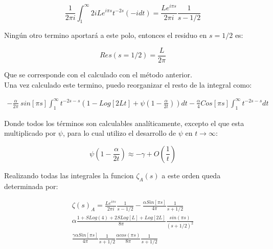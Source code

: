 \begin{equation}
    \frac{1}{2 \pi i }
    \int _1 ^{\infty}
    2 i L
    e^{i \pi s}
    t ^{-2 s}
    (-i dt) =  
    \frac{L e^{i \pi s} }{2 \pi i} \frac{1}{s-1/2   }
\end{equation}

Ningún otro termino aportará a este polo, entonces el residuo en $s= 1/2$ es:

\begin{equation}
    Res (s=1/2) = \frac{L}{2 \pi}
\end{equation}

Que se corresponde con el calculado con el método anterior. \\

Una vez calculado este termino, puedo reorganizar el resto de la integral como:

\begin{equation}
\begin{array}{c}
    - \frac{\alpha}{2 \pi} \ sin[\pi s]
    \int _1 ^{\infty}
    t ^{-2 s-s} 
    \left(
    1 - Log[2Lt] + \psi (1- \frac{\alpha}{2t})
    \right) dt - 
    \frac{\alpha}{4} 
    Cos[\pi s]
    \int _1 ^{\infty} t^{-2s-s} dt
\end{array}
\end{equation}

Donde todos los términos son calculables analíticamente, excepto el que esta multiplicado por $\psi$, para lo cual utilizo el desarrollo de $\psi$ en $t \rightarrow \infty$:

\begin{equation}
    \psi(1-\frac{\alpha}{2 t}) \approx 
    -\gamma + O(\frac{1}{t})
\end{equation}

Realizando todas las integrales la funcion $ \zeta _A (s)$ a este orden queda determinada por:  

\begin{equation}
\begin{array}{c}
    \zeta (s) _{A} = 
    \frac{L e ^{i \pi s}}{2 \pi i} \frac{1}{s-1/2} 
    -\frac{\alpha Sin[\pi s]}{4 \pi} \frac{1}{s+1/2} \\
    \alpha 
    \frac{
    1+S Log(4)+2SLog[L]+Log[2L]
    }
    {8 \pi} \frac{sin(\pi s)}{(s+1/2) ^2}  \\
    \frac{\gamma \alpha Sin[\pi s]}{4 \pi } \frac{1}{s+1/2} 
    \frac{\alpha cos(\pi s) }{8 \pi}  \frac{1}{s+1/2}  \\
\end{array}
\end{equation}

